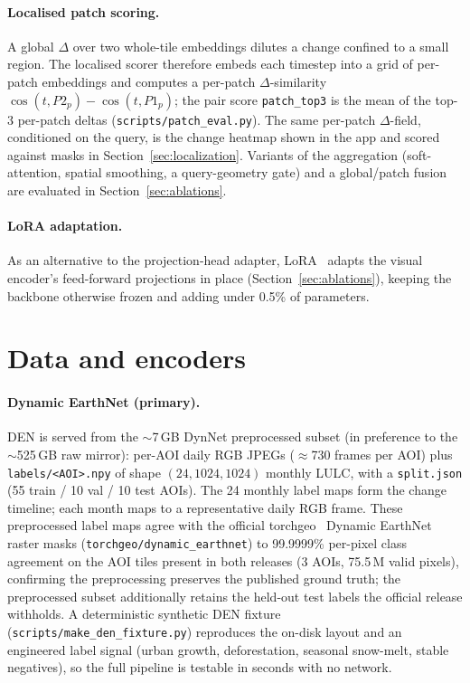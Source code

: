 \documentclass{article}
\begin{document}
\paragraph{Localised patch scoring.}
A global $\Delta$ over two whole-tile embeddings dilutes a change confined to a
small region. The localised scorer therefore embeds each timestep into a grid of
per-patch embeddings and computes a per-patch $\Delta$-similarity
$\cos(t, P2_p) - \cos(t, P1_p)$; the pair score \texttt{patch\_top3} is the mean
of the top-3 per-patch deltas (\texttt{scripts/patch\_eval.py}). The same
per-patch $\Delta$-field, conditioned on the query, is the change heatmap shown
in the app and scored against masks in Section~\ref{sec:localization}. Variants
of the aggregation (soft-attention, spatial smoothing, a query-geometry gate) and
a global/patch fusion are evaluated in Section~\ref{sec:ablations}.

\paragraph{LoRA adaptation.}
As an alternative to the projection-head adapter, LoRA~\cite{lora} adapts the
visual encoder's feed-forward projections in place (Section~\ref{sec:ablations}),
keeping the backbone otherwise frozen and adding under 0.5\% of parameters.


\section{Data and encoders}
\label{sec:data}

\paragraph{Dynamic EarthNet (primary).}
DEN is served from the $\sim$7\,GB DynNet preprocessed subset (in preference to
the $\sim$525\,GB raw mirror): per-AOI daily RGB JPEGs ($\approx$730 frames per
AOI) plus \texttt{labels/<AOI>.npy} of shape $(24, 1024, 1024)$ monthly LULC,
with a \texttt{split.json} (55 train / 10 val / 10 test AOIs). The 24 monthly
label maps form the change timeline; each month maps to a representative daily
RGB frame. These preprocessed label maps agree with the official
torchgeo~\cite{torchgeo} Dynamic EarthNet raster masks
(\texttt{torchgeo/dynamic\_earthnet}) to 99.9999\% per-pixel class agreement on
the AOI tiles present in both releases (3 AOIs, 75.5\,M valid pixels),
confirming the preprocessing preserves the published ground truth; the
preprocessed subset additionally retains the held-out test labels the official
release withholds. A deterministic synthetic DEN fixture
(\texttt{scripts/make\_den\_fixture.py}) reproduces the on-disk layout and an
engineered label signal (urban growth, deforestation, seasonal snow-melt, stable
negatives), so the full pipeline is testable in seconds with no network.
\end{document}
